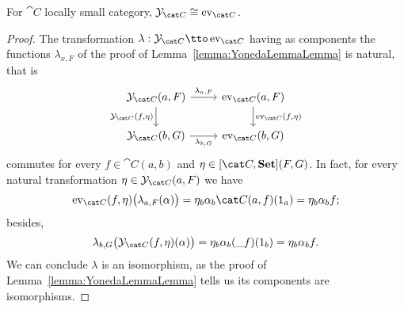 \begin{proposition}
For \(\cat C\) locally small category, \(\yo_{\cat C} \cong \ev_{\cat C}\).
\end{proposition}

\begin{proof}
The transformation \(\lambda : \yo_{\cat C} \tto \ev_{\cat C}\) having as components the functions \(\lambda_{x, F}\) of the proof of Lemma~\ref{lemma:YonedaLemmaLemma} is natural, that is
\[\begin{tikzcd}
\yo_{\cat C} (a, F) \ar["\lambda_{a, F}", r] \ar["{\yo_{\cat C}(f, \eta)}", d, swap] & \ev_{\cat C} (a, F) \ar["{\ev_{\cat C}(f, \eta)}", d] \\
\yo_{\cat C} (b, G) \ar["\lambda_{b, G}", r, swap] & \ev_{\cat C}(b, G)
\end{tikzcd}\]
commutes for every \(f \in \cat C(a, b)\) and \(\eta \in [\cat C, \Set](F, G)\). In fact, for every natural transformation \(\eta \in \yo_{\cat C}(a, F)\) we have
\[\ev_{\cat C}(f, \eta) \big(\lambda_{a, F} (\alpha)\big) =  \eta_b\alpha_b \cat C(a, f)(\id_a) = \eta_b \alpha_b f ;\]
besides,
\[\lambda_{b, G} \big(\yo_{\cat C}(f, \eta) (\alpha)\big) = \eta_b \alpha_b (\_ f)(1_b) = \eta_b \alpha_b f .\]
%
We can conclude \(\lambda\) is an isomorphism, as the proof of Lemma~\ref{lemma:YonedaLemmaLemma} tells us its components are isomorphisms.
\end{proof}

